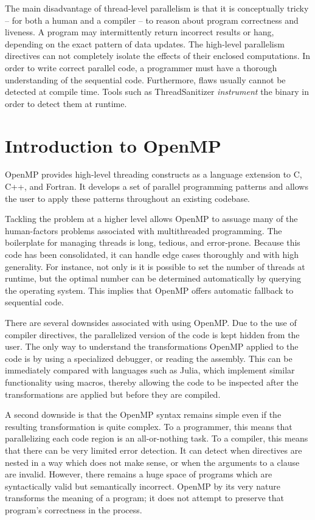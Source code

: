 \documentclass[conference, a4paper]{IEEEtran-modified}
\begin{document}
    The main disadvantage of thread-level parallelism is that it is conceptually tricky -- for both a human and a compiler -- to reason about program correctness and liveness. A program may intermittently return incorrect results or hang, depending on the exact pattern of data updates. The high-level parallelism directives can not completely isolate the effects of their enclosed computations. In order to write correct parallel code, a programmer must have a thorough understanding of the sequential code. Furthermore, flaws usually cannot be detected at compile time. Tools such as ThreadSanitizer \emph{instrument} the binary in order to detect them at runtime.


\section{Introduction to OpenMP}

    OpenMP provides high-level threading constructs as a language extension to C, C++, and Fortran. It develops a set of parallel programming patterns and allows the user to apply these patterns throughout an existing codebase.

    Tackling the problem at a higher level allows OpenMP to assuage many of the human-factors problems associated with multithreaded programming. The boilerplate for managing threads is long, tedious, and error-prone. Because this code has been consolidated, it can handle edge cases thoroughly and with high generality. For instance, not only is it is possible to set the number of threads at runtime, but the optimal number can be determined automatically by querying the operating system. This implies that OpenMP offers automatic fallback to sequential code.  

    There are several downsides associated with using OpenMP. Due to the use of compiler directives, the parallelized version of the code is kept hidden from the user. The only way to understand the transformations OpenMP applied to the code is by using a specialized debugger, or reading the assembly. This can be immediately compared with languages such as Julia, which implement similar functionality using macros, thereby allowing the code to be inspected after the transformations are applied but before they are compiled.

    A second downside is that the OpenMP syntax remains simple even if the resulting transformation is quite complex. To a programmer, this means that parallelizing each code region is an all-or-nothing task. To a compiler, this means that there can be very limited error detection. It can detect when directives are nested in a way which does not make sense, or when the arguments to a clause are invalid. However, there remains a huge space of programs which are syntactically valid but semantically incorrect. OpenMP by its very nature transforms the meaning of a program; it does not attempt to preserve that program's correctness in the process.
\end{document}

